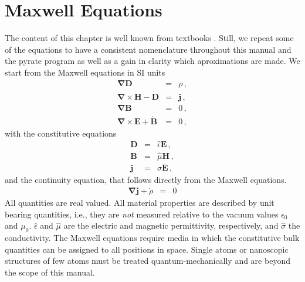 \documentclass[12pt,a4paper,twoside,openright,BCOR10mm,headsepline,titlepage,abstracton,chapterprefix,final]{scrreprt}
\newcommand\Vector[1]{{\mathbf{#1}}}
\newcommand\vacuum{0}
\newcommand\Nabla{\Vector{\nabla}}
\newcommand\timederivative[1]{\dot{{#1}}}
\newcommand\Tensor[1]{\hat{#1}}
\newcommand\scalarEfield{E}
\newcommand\scalarBfield{B}
\newcommand\scalarHfield{H}
\newcommand\scalarDfield{D}
\newcommand\Efield{\Vector{\scalarEfield}}
\newcommand\Bfield{\Vector{\scalarBfield}}
\newcommand\Hfield{\Vector{\scalarHfield}}
\newcommand\Dfield{\Vector{\scalarDfield}}
\newcommand\permeability{\Tensor{\mu}}
\newcommand\vacuumpermeability{\mu_{\vacuum}}
\newcommand\permittivity{\Tensor{\epsilon}}
\newcommand\vacuumpermittivity{\epsilon_{\vacuum}}
\newcommand\conductivity{\Tensor{\sigma}}
\newcommand\currentdensity{\Vector{j}}
\newcommand\chargedensity{\rho}
\begin{document}
\section{Maxwell Equations}
The content of this chapter is well known from textbooks \cite{Jackson}. Still, we repeat some of the equations to have a consistent 
nomenclature throughout this manual and the pyrate program as well as a gain in clarity which aproximations are made.
We start from the Maxwell equations in SI units
\begin{subequations}\label{eq:Maxwell}
\begin{eqnarray}
  \Nabla \Dfield &=& \chargedensity\,, 							\label{eq:MaxwellNablaD}\\
  \Nabla \times \Hfield -\timederivative{\Dfield} &=&  \currentdensity\,,  		\label{eq:MaxwellNablaCrossH} \\
  \Nabla \Bfield &=& 0\,,  									\label{eq:MaxwellNablaB} \\
  \Nabla \times \Efield + \timederivative{\Bfield} &=& 0\,,   					\label{eq:MaxwellNablaCrossE}
\end{eqnarray}
\end{subequations}
with the constitutive equations
\begin{subequations}\label{eq:Material}
\begin{eqnarray}
  \Dfield &=& \permittivity \Efield\,, 								\label{eq:ConstitutiveEpsilon}\\
  \Bfield &=& \permeability \Hfield\,, 								\label{eq:ConstitutiveMu}\\
  \currentdensity &=& \conductivity \Efield\,,						\label{eq:ConstitutiveSigma}
\end{eqnarray}
\end{subequations}
and the continuity equation, that follows directly from the Maxwell equations.
\begin{eqnarray}
  \Nabla \currentdensity + \timederivative{\chargedensity} &=& 0		\label{eq:continuity}
\end{eqnarray}
All quantities are real valued. All material properties are described by unit bearing quantities, i.e., 
they are \emph{not} measured relative to the vacuum values $\vacuumpermittivity$ and $\vacuumpermeability$. 
$\permittivity$ and $\permeability$ are the electric and magnetic permittivity, respectively, and $\conductivity$ the conductivity. 
The Maxwell equations require media in which the constitutive bulk quantities can be assigned to all positions in space.
Single atoms or nanoscopic structures of few atoms must be treated quantum-mechanically and are beyond the scope of this manual.
\end{document}
